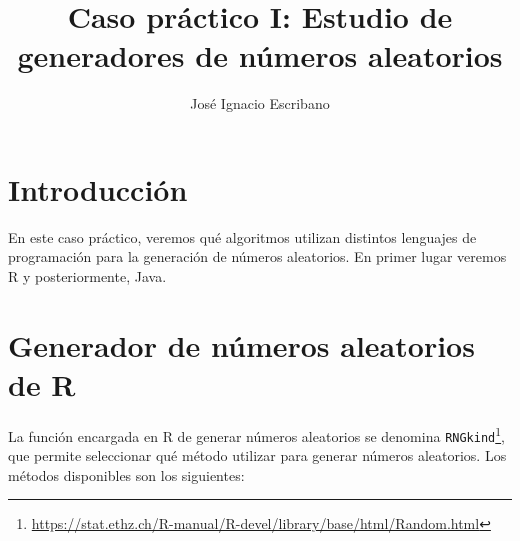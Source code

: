 \documentclass[12pt,a4paper,twoside,openright,titlepage,final]{article}
\author{José Ignacio Escribano}
\title{Caso práctico I: Estudio de generadores de números aleatorios}
\begin{document}
\setcounter{page}{1}


\listoftables
\thispagestyle{empty}
\newpage

\tableofcontents
\thispagestyle{empty}
\newpage


\setcounter{page}{1}

\section{Introducción}

En este caso práctico, veremos qué algoritmos utilizan distintos lenguajes de programación para la generación de números aleatorios. En primer lugar veremos R y posteriormente, Java.

\section{Generador de números aleatorios de R}

La función encargada en R de generar números aleatorios se denomina \texttt{RNGkind}\footnote{\url{https://stat.ethz.ch/R-manual/R-devel/library/base/html/Random.html}}, que permite seleccionar qué método utilizar para generar números aleatorios. Los métodos disponibles son los siguientes:
\end{document}
